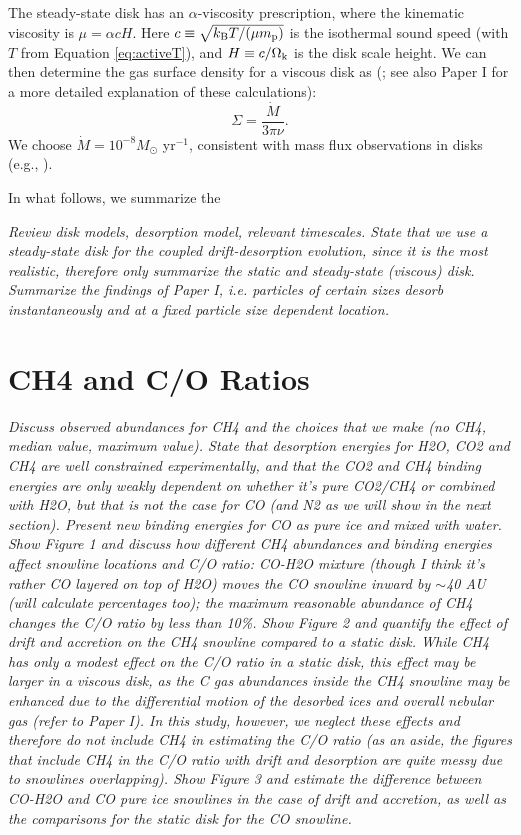 \documentclass[apj]{emulateapj}
\newcommand{\emgr}[1]{\emph{ \color{gray} #1}}
\begin{document}
The steady-state disk has an $\alpha$-viscosity prescription, where the kinematic viscosity is $\mu=\alpha c H$. Here $c \equiv \sqrt{k_{\rm B} T /(\mu m_{\rm p})}$ is the isothermal sound speed (with $T$ from Equation \ref{eq:activeT}), and $H \equiv c/\Omega_{\rm k}$ is the disk scale height. We can then determine the gas surface density for a viscous disk as (\citealt{shakura73}; see also Paper I for a more detailed explanation of these calculations):
\begin{equation}
\label{eq:Sigmaact}
\Sigma=\frac{\dot{M}}{3 \pi \nu}.
\end{equation}
We choose $\dot{M}=10^{-8} M_{\odot}$ yr$^{-1}$, consistent with mass flux observations in disks (e.g., \citealt{andrews10}). 

In what follows, we summarize the 



\emgr{Review disk models, desorption model, relevant timescales. State that we use a steady-state disk for the coupled drift-desorption evolution, since it is the most realistic, therefore only summarize the static and steady-state (viscous) disk. Summarize the findings of Paper I, i.e. particles of certain sizes desorb instantaneously and at a fixed particle size dependent location.}

\section{CH4 and C/O Ratios}

\emgr{Discuss observed abundances for CH4 and the choices that we make (no CH4, median value, maximum value). State that desorption energies for H2O, CO2 and CH4 are well constrained experimentally, and that the CO2 and CH4 binding energies are only weakly dependent on whether it's pure CO2/CH4 or combined with H2O, but that is not the case for CO (and N2 as we will show in the next section). Present new binding energies for CO as pure ice and mixed with water. Show Figure 1 and discuss how different CH4 abundances and binding energies affect snowline locations and C/O ratio: CO-H2O mixture (though I think it's rather CO layered on top of H2O) moves the CO snowline inward by $\sim$40 AU (will calculate percentages too); the maximum reasonable abundance of CH4 changes the C/O ratio by less than 10\%. Show Figure 2 and quantify the effect of drift and accretion on the CH4 snowline compared to a static disk. While CH4 has only a modest effect on the C/O ratio in a static disk, this effect may be larger in a viscous disk, as the C gas abundances inside the CH4 snowline may be enhanced due to the differential motion of the desorbed ices and overall nebular gas (refer to Paper I). In this study, however, we neglect these effects and therefore do not include CH4 in estimating the C/O ratio (as an aside, the figures that include CH4 in the C/O ratio with drift and desorption are quite messy due to snowlines overlapping). Show Figure 3 and estimate the difference between CO-H2O and CO pure ice snowlines in the case of drift and accretion, as well as the comparisons for the static disk for the CO snowline.}
\end{document}
